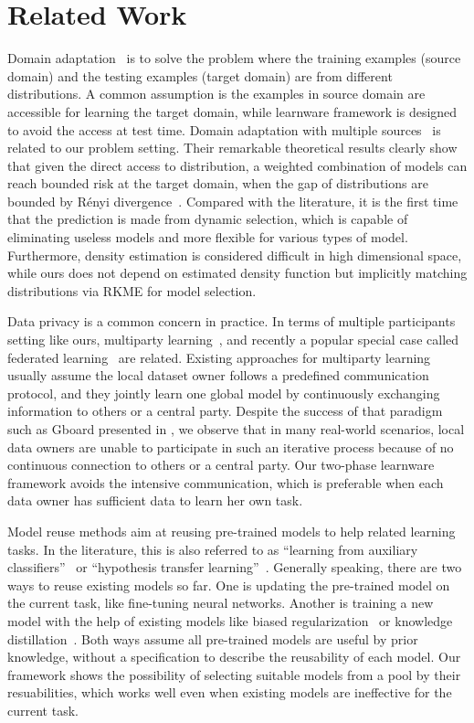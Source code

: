 \documentclass[paper=letter, fontsize=20pt]{article}
\begin{document}
\section{Related Work}
Domain adaptation~\citep{multisource_suvery} is to solve the problem where the training examples (source domain) and the testing examples (target domain) are from different distributions. A common assumption is the examples in source domain are accessible for learning the target domain, while learnware framework is designed to avoid the access at test time. Domain adaptation with multiple sources~\citep{DA_multiple08,DA_multiple18} is related to our problem setting. Their remarkable theoretical results clearly show that given the direct access to distribution, a weighted combination of models can reach bounded risk at the target domain, when the gap of distributions are bounded by R{\'{e}}nyi divergence~\citep{DA_UAI09}. Compared with the literature, it is the first time that the prediction is made from dynamic selection, which is capable of eliminating useless models and more flexible for various types of model. Furthermore, density estimation is considered difficult in high dimensional space, while ours does not depend on estimated density function but implicitly matching distributions via RKME for model selection.

Data privacy is a common concern in practice. In terms of multiple participants setting like ours, multiparty learning~\citep{PP_Aggregation}, and recently a popular special case called federated learning~\citep{federated,federated_google} are related. Existing approaches for multiparty learning usually assume the local dataset owner follows a predefined communication protocol, and they jointly learn one global model by continuously exchanging information to others or a central party. Despite the success of that paradigm such as Gboard presented in \cite{gboard}, we observe that in many real-world scenarios, local data owners are unable to participate in such an iterative process because of no continuous connection to others or a central party. Our two-phase learnware framework avoids the intensive communication, which is preferable when each data owner has sufficient data to learn her own task.

Model reuse methods aim at reusing pre-trained models to help related learning tasks. In the literature, this is also referred to as ``learning from auxiliary classifiers''~\citep{Auxiliary} or ``hypothesis transfer learning''~\citep{Kuzborskij13,HTL_tranformation}. Generally speaking, there are two ways to reuse existing models so far. One is updating the pre-trained model on the current task, like fine-tuning neural networks. Another is training a new model with the help of existing models like biased regularization~\citep{Tommasi14} or knowledge distillation~\citep{nec45,distillation}. Both ways assume all pre-trained models are useful by prior knowledge, without a specification to describe the reusability of each model. Our framework shows the possibility of selecting suitable models from a pool by their resuabilities, which works well even when existing models are ineffective for the current task.
\end{document}
